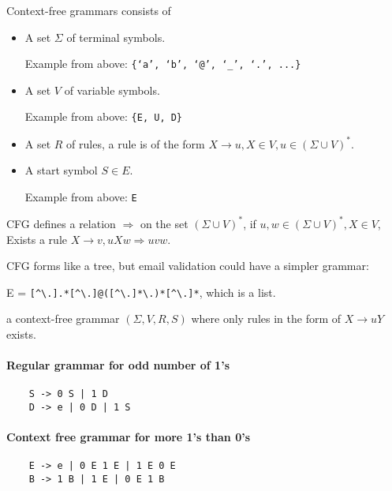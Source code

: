\begin{definition}
Context-free grammars consists of
\begin{itemize}
    \item A set \(\Sigma\) of terminal symbols. 
    
    Example from above: \texttt{\{`a',\ `b',\ `@',\ `\_',\ `.',\ ...\}}
    \item A set \(V\) of variable symbols.
    
    Example from above: \texttt{\{E,\ U,\ D\}}
    \item A set \(R\) of rules, a rule is of the form
\(X \rightarrow u, X \in V, u \in (\Sigma \cup V)^*\).

    \item A start symbol \(S \in E\).
    
    Example from above: \texttt{E}
\end{itemize}
\end{definition}

CFG defines a relation \(\Rightarrow\) on the set \((\Sigma \cup V)^*\),
if
\(u, w \in (\Sigma \cup V)^*, X \in V\), Exists a rule \(X \rightarrow v, uXw \Rightarrow uvw\).

CFG forms like a tree, but email validation could have a simpler
grammar:

E =
\texttt{{[}\^{}\textbackslash{}.{]}.*{[}\^{}\textbackslash{}.{]}@({[}\^{}\textbackslash{}.{]}*\textbackslash{}.)*{[}\^{}\textbackslash{}.{]}*}, which is a list.

\begin{definition}
a context-free grammar \((\Sigma, V, R, S)\) where only
rules in the form of \(X \rightarrow uY\) exists.
\end{definition}

\paragraph{Regular grammar for odd number of 1's}

\begin{verbatim}
    S -> 0 S | 1 D
    D -> e | 0 D | 1 S
\end{verbatim}

\paragraph{Context free grammar for more 1's than 0's}

\begin{verbatim}
    E -> e | 0 E 1 E | 1 E 0 E 
    B -> 1 B | 1 E | 0 E 1 B
\end{verbatim}

